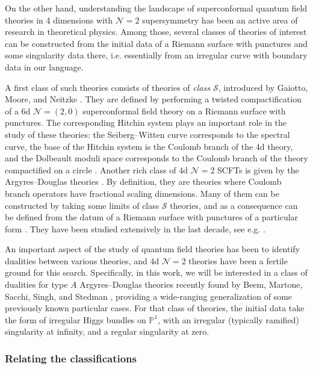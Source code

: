 \documentclass[11pt,a4paper]{amsart}
\numberwithin{equation}{section}
\begin{document}
On the other hand, understanding the landscape of superconformal quantum field theories in 4 dimensions with $\mathcal N=2$ supersymmetry has been an active area of research in theoretical physics. Among those, several classes of theories of interest can be constructed from the initial data of a Riemann surface with punctures and some singularity data there, i.e. essentially from an irregular curve with boundary data in our language. 

A first class of such theories consists of theories of \emph{class $\mathcal S$}, introduced by Gaiotto, Moore, and Neitzke \cite{gaiotto2013wall}. They are defined by performing a twisted compactification of a 6d $\mathcal N=(2,0)$ superconformal field theory on a Riemann surface with punctures. The corresponding Hitchin system plays an important role in the study of these theories: the Seiberg--Witten curve corresponds to the spectral curve, the base of the Hitchin system is the Coulomb branch of the 4d theory, and the Dolbeault moduli space corresponds to the Coulomb branch of the theory compactified on a circle \cite{neitzke2015hitchin}. Another rich class of 4d $\mathcal N=2$ SCFTs is given by the Argyres--Douglas theories \cite{argyres1995new}. By definition, they are theories where Coulomb branch operators have fractional scaling dimensions. Many of them can be constructed by taking some limits of class $\mathcal S$ theories, and as a consequence can be defined from the datum of a Riemann surface with punctures of a particular form \cite{xie2013general}. They have been studied extensively in the last decade, see e.g. \cite{buican2015superconformal,wang2016classification, song2017vertex,creutzig2017w-algebras, benvenuti2017lagrangians,xie2021chiral}. 

An important aspect of the study of quantum field theories has been to identify dualities between various theories, and 4d $\mathcal N=2$ theories have been a fertile ground for this search. Specifically, in this work, we will be interested in a class of dualities for type $A$ Argyres--Douglas theories recently found by Beem, Martone, Sacchi, Singh, and Stedman \cite{beem2025simplifying}, providing a wide-ranging generalization of some previously known particular cases. For that class of theories, the initial data take the form of irregular Higgs bundles on $\mathbb P^1$, with an irregular (typically ramified) singularity at infinity, and a regular singularity at zero. 


\subsubsection{Relating the classifications}
\end{document}
